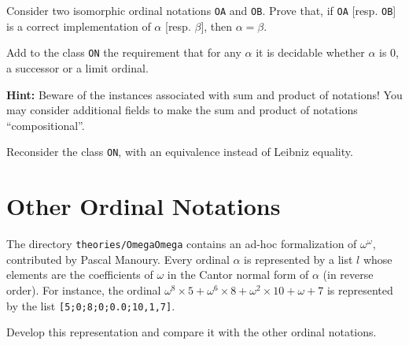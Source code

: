 \begin{project}
Consider two isomorphic ordinal notations \texttt{OA} and \texttt{OB}.
Prove that, if \texttt{OA} [resp. \texttt{OB}] is a correct implementation 
of $\alpha$ [resp. $\beta$], then $\alpha=\beta$.
\end{project}


\begin{project}
\label{project:succ-limit-dec}
Add to the class \texttt{ON} the requirement that for any $\alpha$ it is decidable whether $\alpha$ is $0$, a successor or a limit ordinal.


\textbf{Hint:}   Beware of the instances associated with sum and product of notations!
  You may consider additional fields 
to make the sum and product of notations ``compositional''.

\end{project}

\begin{project}
\label{project:on-setoid}
Reconsider the  class \texttt{ON}, with an equivalence instead of Leibniz equality.
\end{project}






\section{Other Ordinal Notations}


\begin{project}
The directory \texttt{theories/OmegaOmega} contains an ad-hoc formalization of $\omega^\omega$, contributed by Pascal Manoury. Every ordinal $\alpha$ is represented by a list $l$ whose elements are the coefficients of $\omega$ in  the Cantor normal form of $\alpha$ (in reverse order). For instance, the ordinal 
$\omega^{8}\times 5 + \omega^{6}\times 8 + \omega^2\times 10 + \omega + 7$ is represented by the list \texttt{[5;0;8;0;0.0;10,1,7]}. 


 Develop this representation and compare it with the other ordinal notations.



\end{project}


